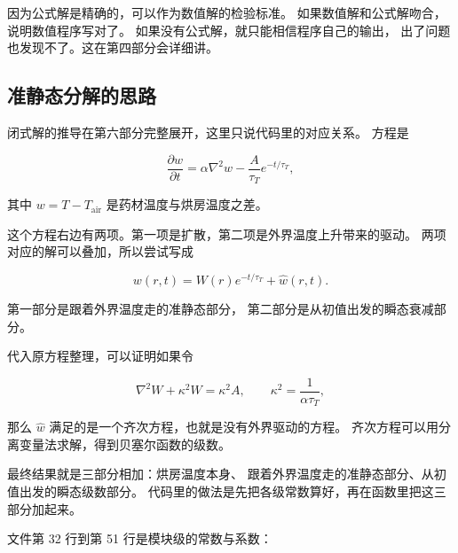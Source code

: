因为公式解是精确的，可以作为数值解的检验标准。
如果数值解和公式解吻合，说明数值程序写对了。
如果没有公式解，就只能相信程序自己的输出，
出了问题也发现不了。这在第四部分会详细讲。

\subsection{准静态分解的思路}

闭式解的推导在第六部分完整展开，这里只说代码里的对应关系。
方程是

\begin{equation}
\frac{\partial w}{\partial t}=\alpha\nabla^2w-\frac{A}{\tau_T}e^{-t/\tau_T},
\end{equation}

其中 $w=T-T_{\mathrm{air}}$ 是药材温度与烘房温度之差。

这个方程右边有两项。第一项是扩散，第二项是外界温度上升带来的驱动。
两项对应的解可以叠加，所以尝试写成

\begin{equation}
w(r,t)=W(r)e^{-t/\tau_T}+\hat w(r,t).
\end{equation}

第一部分是跟着外界温度走的准静态部分，
第二部分是从初值出发的瞬态衰减部分。

代入原方程整理，可以证明如果令

\begin{equation}
\nabla^2W+\kappa^2W=\kappa^2A,\qquad \kappa^2=\frac{1}{\alpha\tau_T},
\end{equation}

那么 $\hat w$ 满足的是一个齐次方程，也就是没有外界驱动的方程。
齐次方程可以用分离变量法求解，得到贝塞尔函数的级数。

最终结果就是三部分相加：烘房温度本身、
跟着外界温度走的准静态部分、从初值出发的瞬态级数部分。
代码里的做法是先把各级常数算好，再在函数里把这三部分加起来。

文件第 32 行到第 51 行是模块级的常数与系数：

